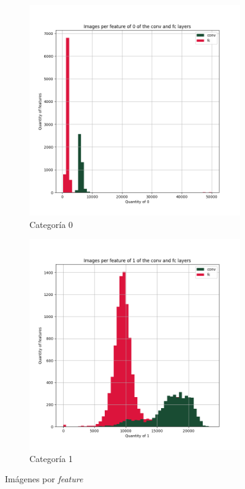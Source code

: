\documentclass[12,twoside]{TFG-GM}
\theoremstyle{definition}
\theoremstyle{remark}
\begin{document}
\begin{figure}[ht]
\begin{subfigure}[b]{0.3\textwidth}
		\includegraphics[width=\textwidth]  {Images/plots/25/Images_per_feature_of_0_category_all_layers.png}
		\caption{Categoría 0}
	\end{subfigure}
	\begin{subfigure}[b]{0.3\textwidth}
		\includegraphics[width=\textwidth]  {Images/plots/25/Images_per_feature_of_1_category_all_layers.png}
		\caption{Categoría 1}
	\end{subfigure}       
	\caption{Imágenes por \textit{feature} \label{fig:imagesperfeature}}
\end{figure}
\end{document}
